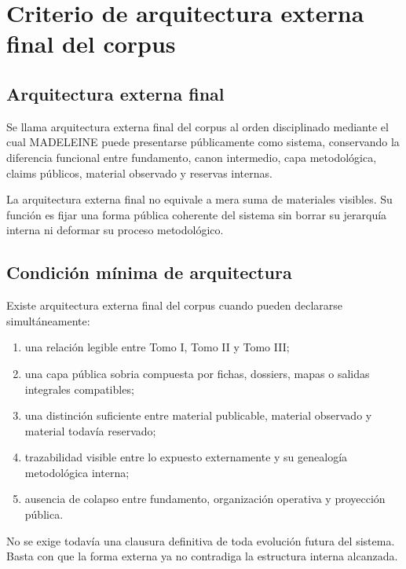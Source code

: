 \chapter{Criterio de arquitectura externa final del corpus}

\section{Arquitectura externa final}
\begin{definition}
Se llama arquitectura externa final del corpus al orden disciplinado mediante el cual MADELEINE puede presentarse públicamente como sistema, conservando la diferencia funcional entre fundamento, canon intermedio, capa metodológica, claims públicos, material observado y reservas internas.
\end{definition}

\begin{observation}
La arquitectura externa final no equivale a mera suma de materiales visibles. Su función es fijar una forma pública coherente del sistema sin borrar su jerarquía interna ni deformar su proceso metodológico.
\end{observation}

\section{Condición mínima de arquitectura}
\begin{definition}
Existe arquitectura externa final del corpus cuando pueden declararse simultáneamente:
\begin{enumerate}
  \item una relación legible entre Tomo I, Tomo II y Tomo III;
  \item una capa pública sobria compuesta por fichas, dossiers, mapas o salidas integrales compatibles;
  \item una distinción suficiente entre material publicable, material observado y material todavía reservado;
  \item trazabilidad visible entre lo expuesto externamente y su genealogía metodológica interna;
  \item ausencia de colapso entre fundamento, organización operativa y proyección pública.
\end{enumerate}
\end{definition}

\begin{observation}
No se exige todavía una clausura definitiva de toda evolución futura del sistema. Basta con que la forma externa ya no contradiga la estructura interna alcanzada.
\end{observation}

